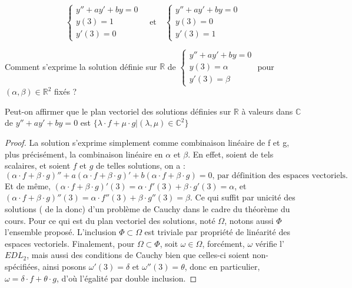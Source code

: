 \documentclass{article}
\begin{document}
\[
    \left\{ \begin{array}{cl}
        y'' +ay'+by = 0 \\
        y(3) = 1\\
        y'(3) = 0
        \end{array} \right.        
	\quad \text{et} \quad
    \left\{ \begin{array}{cl}
        y'' +ay'+by = 0 \\
        y(3) = 0\\
        y'(3) = 1
        \end{array} \right.
\]

Comment s'exprime la solution définie sur $\mathbb{R}$ de $\left\{ \begin{array}{cl}
    y'' +ay'+by = 0 \\
    y(3) = \alpha \\
    y'(3) = \beta
    \end{array} \right. $ pour $(\alpha, \beta)\in \mathbb{R}^2$ fixés ? 

Peut-on affirmer que le plan vectoriel des solutions définies sur $\mathbb{R}$ à valeurs dans 
$\mathbb{C}$ de $y'' + ay' + by = 0$ est $\{ \lambda \cdot f + \mu \cdot g  | 
(\lambda, \mu)\in \mathbb{C}^2\}$

\begin{proof}
    La solution s'exprime simplement comme combinaison linéaire de f et g, plus précisément, la 
    combinaison linéaire en $\alpha$ et $\beta$. En effet, soient de tels scalaires, et soient $f$ et 
    $g$ de telles solutions, on a : 
    \[
        (\alpha \cdot f + \beta \cdot g)'' + a (\alpha \cdot f + \beta \cdot g)' + b (\alpha \cdot f + 
        \beta \cdot g) = 0 \text{, par définition des espaces vectoriels.}
    \]
    Et de même, $(\alpha \cdot f + \beta \cdot g)'(3) = \alpha \cdot f'(3) + \beta \cdot g'(3) = \alpha$,
    et $(\alpha \cdot f + \beta \cdot g)''(3) = \alpha \cdot f''(3) + \beta \cdot g''(3) = \beta$.
    \newline
    Ce qui suffit par unicité des solutions ( de la donc) d'un problème de Cauchy dans le cadre du 
    théorème du cours.
    \newline
    Pour ce qui est du plan vectoriel des solutions, noté $\Omega$, notons aussi $\Phi$ l'ensemble proposé.
    L'inclusion $\Phi \subset \Omega$ est triviale par propriété de linéarité des espaces vectoriels.
    Finalement, pour $\Omega \subset \Phi$, soit $\omega \in \Omega$, forcément, $\omega$ vérifie 
    l'$EDL_2$, mais aussi des conditions de Cauchy bien que celles-ci soient non-spécifiées, ainsi
    posons $\omega'(3) = \delta$ et $\omega''(3) = \theta$, donc en particulier, $ \omega = 
    \delta \cdot f + \theta \cdot g$, d'où l'égalité par double inclusion.
\end{proof}
\end{document}
